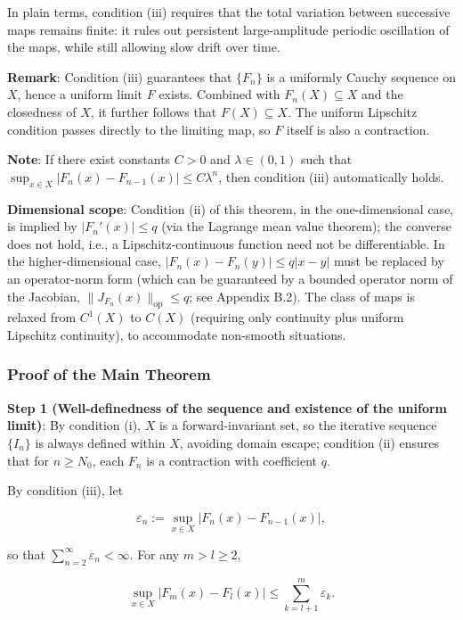 \documentclass[11pt,a4paper]{amsart}
\begin{document}
In plain terms, condition (iii) requires that the total variation between successive maps remains finite: it rules out persistent large-amplitude periodic oscillation of the maps, while still allowing slow drift over time.

\textbf{Remark}: Condition (iii) guarantees that $\{F_n\}$ is a uniformly Cauchy sequence on $X$, hence a uniform limit $F$ exists. Combined with $F_n(X) \subseteq X$ and the closedness of $X$, it further follows that $F(X) \subseteq X$. The uniform Lipschitz condition passes directly to the limiting map, so $F$ itself is also a contraction.

\textbf{Note}: If there exist constants $C>0$ and $\lambda \in (0,1)$ such that $\sup_{x\in X}|F_n(x) - F_{n-1}(x)| \le C\lambda^n$, then condition (iii) automatically holds.

\textbf{Dimensional scope}: Condition (ii) of this theorem, in the one-dimensional case, is implied by $|F_n'(x)| \le q$ (via the Lagrange mean value theorem); the converse does not hold, i.e., a Lipschitz-continuous function need not be differentiable. In the higher-dimensional case, $|F_n(x) - F_n(y)| \le q|x - y|$ must be replaced by an operator-norm form (which can be guaranteed by a bounded operator norm of the Jacobian, $\|J_{F_n}(x)\|_{\mathrm{op}} \le q$; see Appendix B.2). The class of maps is relaxed from $C^1(X)$ to $C(X)$ (requiring only continuity plus uniform Lipschitz continuity), to accommodate non-smooth situations.

\subsubsection*{Proof of the Main Theorem}

\textbf{Step 1 (Well-definedness of the sequence and existence of the uniform limit)}: By condition (i), $X$ is a forward-invariant set, so the iterative sequence $\{I_n\}$ is always defined within $X$, avoiding domain escape; condition (ii) ensures that for $n \ge N_0$, each $F_n$ is a contraction with coefficient $q$.

By condition (iii), let

\begin{equation}
\label{eq:eps-def}
\varepsilon_n := \sup_{x\in X}|F_n(x) - F_{n-1}(x)|,
\end{equation}

so that $\sum_{n=2}^\infty \varepsilon_n < \infty$. For any $m > l \ge 2$,

\begin{equation}
\sup_{x\in X}|F_m(x) - F_l(x)| \le \sum_{k=l+1}^m \varepsilon_k.
\end{equation}
\end{document}
